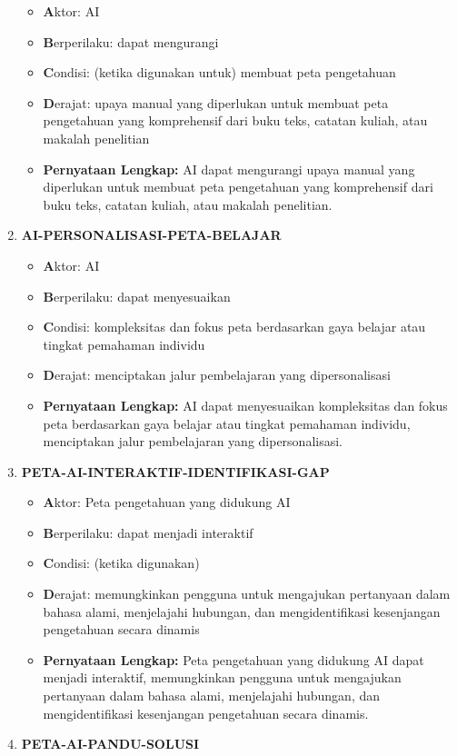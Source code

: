\documentclass[
  letterpaper,
  DIV=11,
  numbers=noendperiod]{scrreprt}
\begin{document}
\begin{enumerate}
  \begin{itemize}
  \item
    \textbf{A}ktor: AI
  \item
    \textbf{B}erperilaku: dapat mengurangi
  \item
    \textbf{C}ondisi: (ketika digunakan untuk) membuat peta pengetahuan
  \item
    \textbf{D}erajat: upaya manual yang diperlukan untuk membuat peta
    pengetahuan yang komprehensif dari buku teks, catatan kuliah, atau
    makalah penelitian
  \item
    \textbf{Pernyataan Lengkap:} AI dapat mengurangi upaya manual yang
    diperlukan untuk membuat peta pengetahuan yang komprehensif dari
    buku teks, catatan kuliah, atau makalah penelitian.
  \end{itemize}
\item
  \textbf{AI-PERSONALISASI-PETA-BELAJAR}

  \begin{itemize}
  \item
    \textbf{A}ktor: AI
  \item
    \textbf{B}erperilaku: dapat menyesuaikan
  \item
    \textbf{C}ondisi: kompleksitas dan fokus peta berdasarkan gaya
    belajar atau tingkat pemahaman individu
  \item
    \textbf{D}erajat: menciptakan jalur pembelajaran yang
    dipersonalisasi
  \item
    \textbf{Pernyataan Lengkap:} AI dapat menyesuaikan kompleksitas dan
    fokus peta berdasarkan gaya belajar atau tingkat pemahaman individu,
    menciptakan jalur pembelajaran yang dipersonalisasi.
  \end{itemize}
\item
  \textbf{PETA-AI-INTERAKTIF-IDENTIFIKASI-GAP}

  \begin{itemize}
  \item
    \textbf{A}ktor: Peta pengetahuan yang didukung AI
  \item
    \textbf{B}erperilaku: dapat menjadi interaktif
  \item
    \textbf{C}ondisi: (ketika digunakan)
  \item
    \textbf{D}erajat: memungkinkan pengguna untuk mengajukan pertanyaan
    dalam bahasa alami, menjelajahi hubungan, dan mengidentifikasi
    kesenjangan pengetahuan secara dinamis
  \item
    \textbf{Pernyataan Lengkap:} Peta pengetahuan yang didukung AI dapat
    menjadi interaktif, memungkinkan pengguna untuk mengajukan
    pertanyaan dalam bahasa alami, menjelajahi hubungan, dan
    mengidentifikasi kesenjangan pengetahuan secara dinamis.
  \end{itemize}
\item
  \textbf{PETA-AI-PANDU-SOLUSI}


\end{enumerate}
\end{document}
